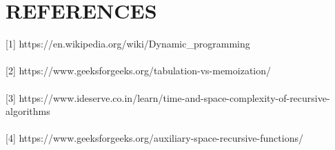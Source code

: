 \documentclass[conference]{IEEEtran}
\begin{document}
\section{REFERENCES}
[1] https://en.wikipedia.org/wiki/Dynamic_programming\\\\

[2] https://www.geeksforgeeks.org/tabulation-vs-memoization/\\\\
	
[3] https://www.ideserve.co.in/learn/time-and-space-complexity-of-recursive-algorithms\\\\

[4] https://www.geeksforgeeks.org/auxiliary-space-recursive-functions/\\\\
\end{document}
